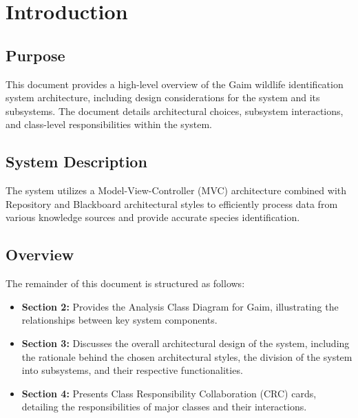 \documentclass[]{article}
\begin{document}
\newpage
\section{Introduction}
\label{sec:introduction}
\subsection{Purpose}
\label{sub:purpose}
This document provides a high-level overview of the Gaim wildlife identification system architecture, including design considerations for the system and its subsystems. The document details architectural choices, subsystem interactions, and class-level responsibilities within the system.\newline


\subsection{System Description}
\label{sub:system_description}
The system utilizes a Model-View-Controller (MVC) architecture combined with Repository and Blackboard architectural styles to efficiently process data from various knowledge sources and provide accurate species identification.\newline




\subsection{Overview}
\label{sub:overview}
The remainder of this document is structured as follows:

\begin{itemize}
    \item \textbf{Section 2:} Provides the Analysis Class Diagram for Gaim, illustrating the relationships between key system components.
    \item \textbf{Section 3:} Discusses the overall architectural design of the system, including the rationale behind the chosen architectural styles, the division of the system into subsystems, and their respective functionalities.
    \item \textbf{Section 4:} Presents Class Responsibility Collaboration (CRC) cards, detailing the responsibilities of major classes and their interactions.
\end{itemize}
\end{document}
